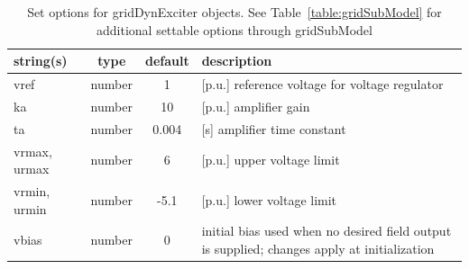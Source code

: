 \begin{table}[ht]
\centering
\begin{tabular}{p{5cm} c c p{7cm}}
\hline
string(s) & type & default & description \\
\hline
vref & number & 1 & [p.u.] reference voltage for voltage regulator\\
ka & number & 10 & [p.u.] amplifier gain\\
ta & number & 0.004 & [s]    amplifier time constant\\
vrmax, urmax & number & 6 & [p.u.] upper voltage limit\\
vrmin, urmin & number & -5.1 & [p.u.] lower voltage limit\\
vbias & number & 0 & initial bias used when no desired field output is supplied; changes apply at initialization\\
\hline
\end{tabular}
\caption{Set options for gridDynExciter objects. See Table~\ref{table:gridSubModel} for additional settable options through gridSubModel}
\label{table:gridDynExciter}
\end{table}
